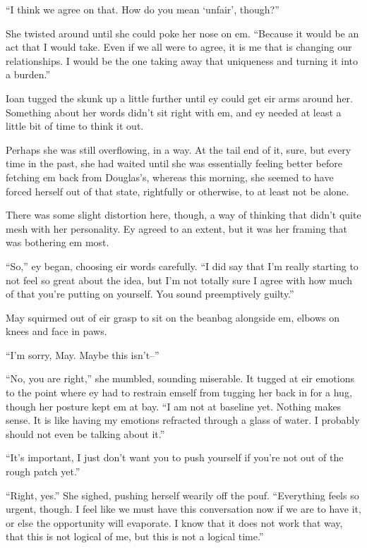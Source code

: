 ``I think we agree on that. How do you mean `unfair', though?''

She twisted around until she could poke her nose on em. ``Because it would be an act that I would take. Even if we all were to agree, it is me that is changing our relationships. I would be the one taking away that uniqueness and turning it into a burden.''

Ioan tugged the skunk up a little further until ey could get eir arms around her. Something about her words didn't sit right with em, and ey needed at least a little bit of time to think it out.

Perhaps she was still overflowing, in a way. At the tail end of it, sure, but every time in the past, she had waited until she was essentially feeling better before fetching em back from Douglas's, whereas this morning, she seemed to have forced herself out of that state, rightfully or otherwise, to at least not be alone.

There was some slight distortion here, though, a way of thinking that didn't quite mesh with her personality. Ey agreed to an extent, but it was her framing that was bothering em most.

``So,'' ey began, choosing eir words carefully. ``I did say that I'm really starting to not feel so great about the idea, but I'm not totally sure I agree with how much of that you're putting on yourself. You sound preemptively guilty.''

May squirmed out of eir grasp to sit on the beanbag alongside em, elbows on knees and face in paws.

``I'm sorry, May. Maybe this isn't--''

``No, you are right,'' she mumbled, sounding miserable. It tugged at eir emotions to the point where ey had to restrain emself from tugging her back in for a hug, though her posture kept em at bay. ``I am not at baseline yet. Nothing makes sense. It is like having my emotions refracted through a glass of water. I probably should not even be talking about it.''

``It's important, I just don't want you to push yourself if you're not out of the rough patch yet.''

``Right, yes.'' She sighed, pushing herself wearily off the pouf. ``Everything feels so urgent, though. I feel like we must have this conversation now if we are to have it, or else the opportunity will evaporate. I know that it does not work that way, that this is not logical of me, but this is not a logical time.''

